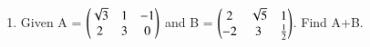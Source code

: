 \renewcommand{\theequation}{\theenumi}
\begin{enumerate}[label=\thesection.\arabic*.,ref=\thesection.\theenumi]
\item Given A = $\begin{pmatrix}\sqrt{3}&1&-1\\2&3&0\end{pmatrix}$ and B = $\begin{pmatrix}2&\sqrt{5}&1\\-2&3&\frac{1}{2}\end{pmatrix}$. Find A+B. 
\end{enumerate}